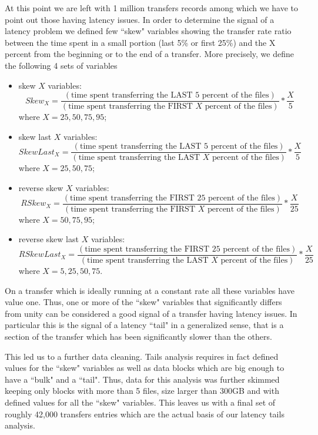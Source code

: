 At this point we are left with 1 million transfers records among which
we have to point out those having latency issues.  In order to
determine the signal of a latency problem we defined few ``skew"
variables showing the transfer rate ratio between the time spent in a
small portion (last 5\% or first 25\%) and the X percent from the
beginning or to the end of a transfer.  More precisely, we define the
following 4 sets of variables

\begin{itemize}
\item skew $X$ variables: 
  \begin{equation}
  Skew_X=\frac{\left( \mbox{time spent transferring the LAST 5 percent of the files} \right)}{ \left( \mbox{time spent transferring the FIRST } X \mbox{ percent of the files} \right)} * \frac{X}{5}
  \label{eq:skew}
   \end{equation}
   where $X=25,50,75,95$;
\item skew last $X$ variables: 
  \begin{equation}
   SkewLast_X=\frac{\left( \mbox{time spent transferring the LAST 5 percent of the files}\right)}{\left(\mbox{time spent transferring the LAST } X \mbox{ percent of the files}\right)} * \frac{X}{5}
  \label{eq:skewlast}
  \end{equation} 
   where $X=25,50,75$;
\item reverse skew  $X$ variables: 
  \begin{equation}
    RSkew_X=\frac{\left( \mbox{time spent transferring the FIRST 25 percent of the files}\right)}{\left( \mbox{time spent transferring the FIRST }X \mbox{ percent of the files}\right)} *  \frac{X}{25} 
  \label{eq:revskew}
  \end{equation}  
   where $X=50,75,95$;
\item reverse skew last $X$ variables: 
  \begin{equation}
    RSkewLast_X=\frac{\left(\mbox{time spent transferring the FIRST 25 percent of the files}\right)}{ \left(\mbox{time spent transferring the LAST }X\mbox{ percent of the files}\right)} * \frac{X}{25} 
  \label{eq:revskewlast}
  \end{equation}
   where $X=5,25,50,75$.
\end{itemize}

On a transfer which is ideally running at a constant rate all these
variables have value one. Thus, one or more of the ``skew" variables
that significantly differs from unity can be considered a good signal
of a transfer having latency issues. In particular this is the signal
of a latency ``tail" in a generalized sense, that is a section of the
transfer which has been significantly slower than the others.

This led us to a further data cleaning. Tails analysis requires in
fact defined values for the ``skew" variables as well as data blocks
which are big enough to have a ``bulk" and a ``tail". Thus, data for
this analysis was further skimmed keeping only blocks with more than 5
files, size larger than 300GB and with defined values for all the
``skew" variables. This leaves us with a final set of roughly 42,000
transfers entries which are the actual basis of our latency tails
analysis.


